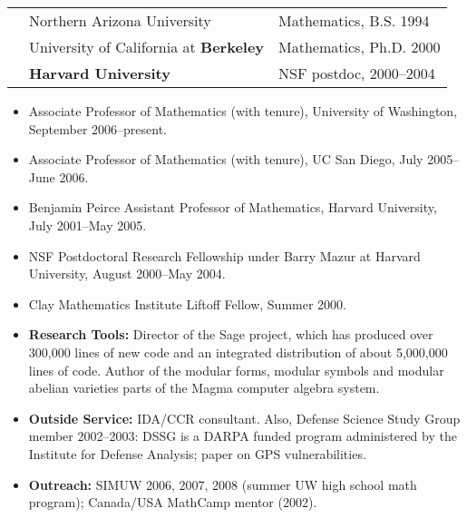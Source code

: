 \documentclass[11pt]{article}
\begin{document}

%
\begin{center}
\begin{tabular}{lll}
\mbox{}\hspace{4.2ex}&   Northern Arizona University\hspace{1.03in}\mbox{}& Mathematics, B.S. 1994 \\
&  University of California at \textbf{Berkeley} & Mathematics, Ph.D. 2000 \\
&  \textbf{Harvard University} & NSF postdoc, 2000--2004 \\
\end{tabular}
\end{center}

\begin{itemize}\setlength{\itemsep}{0ex}
\item Associate Professor of Mathematics (with tenure),
University of Washington, September 2006--present.
\item Associate Professor of Mathematics (with tenure),
UC San Diego, July 2005--June 2006.
\item Benjamin Peirce Assistant  Professor  of Mathematics, 
Harvard University, July 2001--May 2005.
\item NSF Postdoctoral Research Fellowship 
under Barry Mazur at Harvard University, August 2000--May 2004.
\item Clay Mathematics Institute Liftoff Fellow, Summer 2000.
\end{itemize}


\begin{itemize}\setlength{\itemsep}{0ex}

\item {\bf Research Tools:} Director of the Sage project, which has
  produced over 300,000 lines of new code and an integrated
  distribution of about 5,000,000 lines of code.  Author of the
  modular forms, modular symbols and modular abelian varieties parts
  of the Magma computer algebra system.%

\item {\bf Outside Service:} IDA/CCR consultant.  Also, Defense
  Science Study Group member 2002--2003: DSSG is a DARPA funded
  program administered by the Institute for Defense Analysis; paper on
  GPS vulnerabilities.
\item {\bf Outreach:} SIMUW 2006, 2007, 2008 (summer UW high school
  math program); Canada/USA MathCamp mentor (2002).
\end{itemize}
\end{document}
